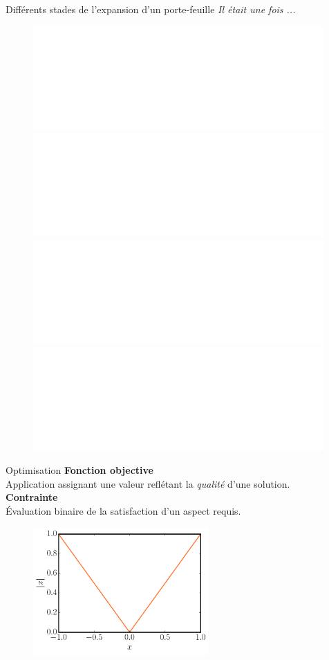 \begin{frame}{Différents stades de l'expansion d'un porte-feuille}
  \textit{Il était une fois ...}
  \begin{figure}[tb]
    \centering
    \includegraphics<1>[width=0.99\textwidth]{figures/schema_optimisation0.pdf}
    \includegraphics<2>[width=0.99\textwidth]{figures/schema_optimisation1.pdf}
    \includegraphics<3>[width=0.99\textwidth]{figures/schema_optimisation2.pdf}
    \includegraphics<4>[width=0.99\textwidth]{figures/schema_optimisation3.pdf}
  \end{figure} 
\end{frame}

\begin{frame}{Optimisation}
\vspace{-10pt}
\textbf{Fonction objective } \\ Application assignant une valeur reflétant la \textit{qualité} d'une solution. \\
\textbf{Contrainte } \\ Évaluation binaire de la satisfaction d'un aspect requis.
\pause
  \begin{figure}[h!]
    \centering
    \includegraphics[width=0.60\textwidth]{figures/absolute_function.pdf}
  \end{figure}
\end{frame}